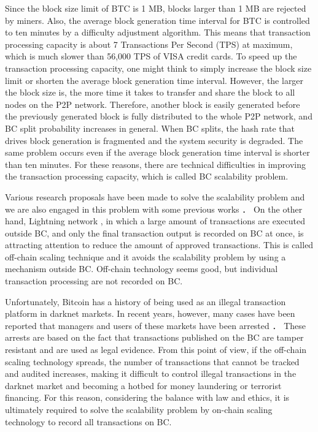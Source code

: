 \documentclass[graybox]{svmult}
\begin{document}
Since the block size limit of BTC is 1 MB, blocks larger than 1 MB are rejected by miners. 
Also, the average block generation time interval for BTC is controlled to ten minutes by a difficulty adjustment algorithm. 
This means that transaction processing capacity is about 7 Transactions Per Second (TPS) at maximum, which is much slower than 56,000 TPS of VISA credit cards. 
To speed up the transaction processing capacity, one might think to simply increase the block size limit or shorten the average block generation time interval. 
However, the larger the block size is, the more time it takes to transfer and share the block to all nodes on the P2P network. 
Therefore, another block is easily generated before the previously generated block is fully distributed to the whole P2P network, and BC split probability increases in general. 
When BC splits, the hash rate that drives block generation is fragmented and the system security is degraded. 
The same problem occurs even if the average block generation time interval is shorter than ten minutes. 
For these reasons, there are technical difficulties in improving the transaction processing capacity, which is called BC scalability problem.


Various research proposals have been made to solve the scalability problem \cite{ZHZB2020} and we are also engaged in this problem with some previous works \cite{Fujihara2018,Fujihara2019,Fujihara2020,YF2021a,YF2021b}．
On the other hand, Lightning network \cite{PD2016}, in which a large amount of transactions are executed outside BC, and only the final transaction output is recorded on BC at once, is attracting attention to reduce the amount of approved transactions. 
This is called off-chain scaling technique and it avoids the scalability problem by using a mechanism outside BC. 
Off-chain technology seems good, but individual transaction processing are not recorded on BC.


Unfortunately, Bitcoin has a history of being used as an illegal transaction platform in darknet markets.
In recent years, however, many cases have been reported that managers and users of these markets have been arrested \cite{silkroad,alphabay,welcome2video}．
These arrests are based on the fact that transactions published on the BC are tamper resistant and are used as legal evidence.
From this point of view, if the off-chain scaling technology spreads, the number of transactions that cannot be tracked and audited increases, making it difficult to control illegal transactions in the darknet market and becoming a hotbed for money laundering or terrorist financing. 
For this reason, considering the balance with law and ethics, it is ultimately required to solve the scalability problem by on-chain scaling technology to record all transactions on BC. 
\end{document}
